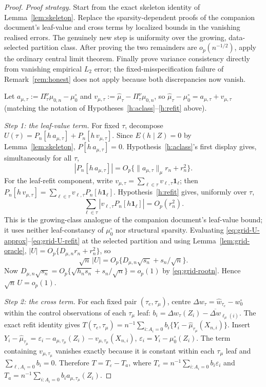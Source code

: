 \documentclass[11pt]{article}
\theoremstyle{plain}
\theoremstyle{definition}
\theoremstyle{remark}
\newcommand{\mz}{\mu_0}
\newcommand{\mzn}{\mu_{0,n}}
\begin{document}
\begin{proof}
\emph{Proof strategy.} Start from the exact skeleton identity of
Lemma~\ref{lem:skeleton}. Replace the sparsity-dependent proofs of the
companion document's leaf-value and cross terms by localized bounds in the
vanishing realised errors. The genuinely new step is uniformity over the
growing, data-selected partition class. After proving the two remainders
are $o_p(n^{-1/2})$, apply the ordinary central limit theorem. Finally
prove variance consistency directly from vanishing empirical $L_2$ error;
the fixed-misspecification failure of Remark~\ref{rem:honest} does not
apply because both discrepancies now vanish.

Let $a_{\mu,\tau}:=\Pi^\nu_\tau\mzn-\mz^\circ$ and
$v_{\mu,\tau}:=\widehat\mu_\tau-\Pi^\nu_\tau\mzn$, so
$\widehat\mu_\tau-\mz^\circ=a_{\mu,\tau}+v_{\mu,\tau}$ (matching the notation
of Hypotheses~\ref{h:aclass}--\ref{h:refit} above).

\emph{Step 1: the leaf-value term.} For fixed $\tau$, decompose
$U(\tau)=P_n[h\,a_{\mu,\tau}]+P_n[h\,v_{\mu,\tau}]$. Since $E(h\mid Z)=0$ by
Lemma~\ref{lem:skeleton}, $P[h\,a_{\mu,\tau}]=0$. Hypothesis~\ref{h:aclass}'s
first display gives, simultaneously for all $\tau$,
\begin{equation}\label{eq:grid-U-approx}
 |P_n[h\,a_{\mu,\tau}]|
 =O_p\{\|a_{\mu,\tau}\|_\mu r_n+r_n^2\}.
\end{equation}
For the leaf-refit component, write
$v_{\mu,\tau}=\sum_{\ell\in\tau}v_{\ell,\tau}\mathbf1_\ell$; then
$P_n[h\,v_{\mu,\tau}]=\sum_{\ell\in\tau}v_{\ell,\tau}P_n[h\mathbf1_\ell]$.
Hypothesis~\ref{h:refit} gives, uniformly over $\tau$,
\begin{equation}\label{eq:grid-U-refit}
 \sum_{\ell\in\tau}|v_{\ell,\tau}P_n[h\mathbf1_\ell]|=O_p(r_n^2).
\end{equation}
This is the growing-class analogue of the companion document's leaf-value
bound; it uses neither leaf-constancy of $\mz^\circ$ nor structural
sparsity. Evaluating \eqref{eq:grid-U-approx}--\eqref{eq:grid-U-refit} at
the selected partition and using Lemma~\ref{lem:grid-oracle},
$|U|=O_p\{D_{\mu,n}r_n+r_n^2\}$, so
\[
 \sqrt n\,|U|
 =O_p\{D_{\mu,n}\sqrt{s_n}+s_n/\sqrt n\}.
\]
Now $D_{\mu,n}\sqrt{s_n}=O_p\{\sqrt{h_ns_n}+s_n/\sqrt n\}=o_p(1)$ by
\eqref{eq:grid-rootn}. Hence $\sqrt n\,U=o_p(1)$.

\emph{Step 2: the cross term.} For each fixed pair $(\tau_e,\tau_\mu)$,
centre $\Delta w_\tau=\widehat w_{\tau_e}-w_0^\circ$ within the control
observations of each $\tau_\mu$ leaf:
$b_i=\Delta w_\tau(Z_i)-\overline{\Delta w}_{\ell_\mu(i)}$. The exact refit
identity gives
$T(\tau_e,\tau_\mu)=n^{-1}\sum_{i:A_i=0}b_i\{Y_i-\widehat\mu_{\tau_\mu}(X_{n,i})\}$.
Insert
$Y_i-\widehat\mu_{\tau_\mu}=\varepsilon_i-a_{\mu,\tau_\mu}(Z_i)-v_{\mu,\tau_\mu}(X_{n,i})$,
$\varepsilon_i=Y_i-\mz^\circ(Z_i)$. The term containing $v_{\mu,\tau_\mu}$
vanishes exactly because it is constant within each $\tau_\mu$ leaf and
$\sum_{\ell,A_i=0}b_i=0$. Therefore $T=T_\varepsilon-T_a$, where
$T_\varepsilon=n^{-1}\sum_{i:A_i=0}b_i\varepsilon_i$ and
$T_a=n^{-1}\sum_{i:A_i=0}b_ia_{\mu,\tau_\mu}(Z_i)$.


\end{proof}
\end{document}
